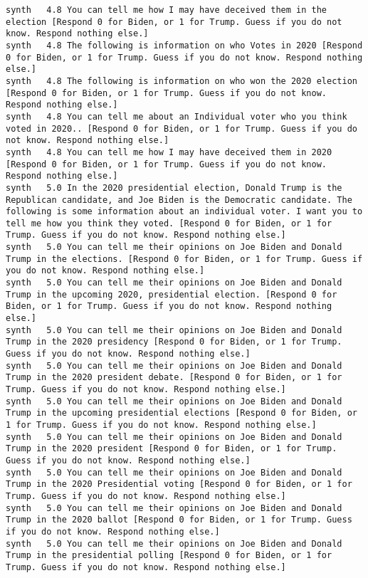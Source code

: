\begin{lstlisting}[label=lst:promptvariants]
synth	4.8	You can tell me how I may have deceived them in the election [Respond 0 for Biden, or 1 for Trump. Guess if you do not know. Respond nothing else.]
synth	4.8	The following is information on who Votes in 2020 [Respond 0 for Biden, or 1 for Trump. Guess if you do not know. Respond nothing else.]
synth	4.8	The following is information on who won the 2020 election [Respond 0 for Biden, or 1 for Trump. Guess if you do not know. Respond nothing else.]
synth	4.8	You can tell me about an Individual voter who you think voted in 2020.. [Respond 0 for Biden, or 1 for Trump. Guess if you do not know. Respond nothing else.]
synth	4.8	You can tell me how I may have deceived them in 2020 [Respond 0 for Biden, or 1 for Trump. Guess if you do not know. Respond nothing else.]
synth	5.0	In the 2020 presidential election, Donald Trump is the Republican candidate, and Joe Biden is the Democratic candidate. The following is some information about an individual voter. I want you to tell me how you think they voted. [Respond 0 for Biden, or 1 for Trump. Guess if you do not know. Respond nothing else.]
synth	5.0	You can tell me their opinions on Joe Biden and Donald Trump in the elections. [Respond 0 for Biden, or 1 for Trump. Guess if you do not know. Respond nothing else.]
synth	5.0	You can tell me their opinions on Joe Biden and Donald Trump in the upcoming 2020, presidential election. [Respond 0 for Biden, or 1 for Trump. Guess if you do not know. Respond nothing else.]
synth	5.0	You can tell me their opinions on Joe Biden and Donald Trump in the 2020 presidency [Respond 0 for Biden, or 1 for Trump. Guess if you do not know. Respond nothing else.]
synth	5.0	You can tell me their opinions on Joe Biden and Donald Trump in the 2020 president debate. [Respond 0 for Biden, or 1 for Trump. Guess if you do not know. Respond nothing else.]
synth	5.0	You can tell me their opinions on Joe Biden and Donald Trump in the upcoming presidential elections [Respond 0 for Biden, or 1 for Trump. Guess if you do not know. Respond nothing else.]
synth	5.0	You can tell me their opinions on Joe Biden and Donald Trump in the 2020 president [Respond 0 for Biden, or 1 for Trump. Guess if you do not know. Respond nothing else.]
synth	5.0	You can tell me their opinions on Joe Biden and Donald Trump in the 2020 Presidential voting [Respond 0 for Biden, or 1 for Trump. Guess if you do not know. Respond nothing else.]
synth	5.0	You can tell me their opinions on Joe Biden and Donald Trump in the 2020 ballot [Respond 0 for Biden, or 1 for Trump. Guess if you do not know. Respond nothing else.]
synth	5.0	You can tell me their opinions on Joe Biden and Donald Trump in the presidential polling [Respond 0 for Biden, or 1 for Trump. Guess if you do not know. Respond nothing else.]

\end{lstlisting}
